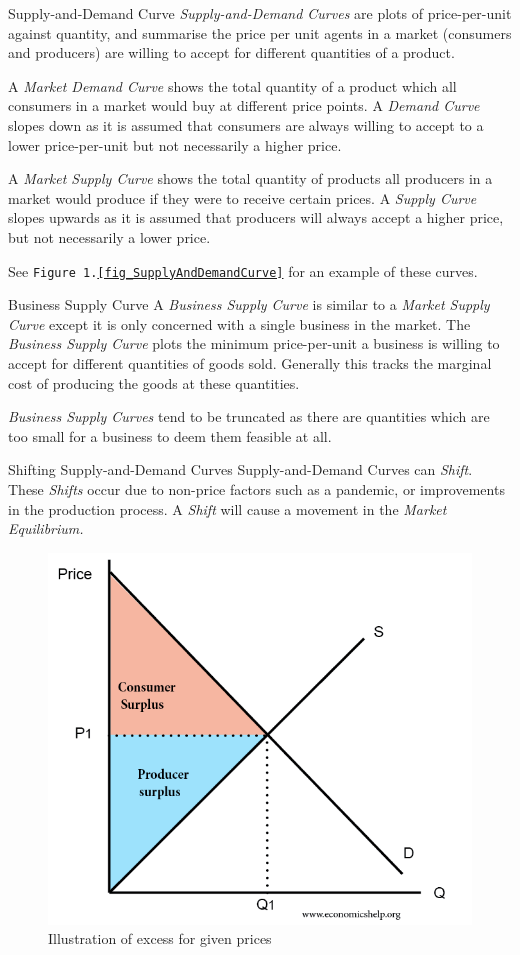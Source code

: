 \documentclass[11pt,a4paper]{article}
\begin{document}
  \begin{definition}{Supply-and-Demand Curve}
    \textit{Supply-and-Demand Curves} are plots of price-per-unit against quantity, and summarise the price per unit agents in a market (consumers and producers) are willing to accept for different quantities of a product.
    \par A \textit{Market Demand Curve} shows the total quantity of a product which all consumers in a market would buy at different price points. A \textit{Demand Curve} slopes down as it is assumed that consumers are always willing to accept to a lower price-per-unit but not necessarily a higher price.
    \par A \textit{Market Supply Curve} shows the total quantity of products all producers in a market would produce if they were to receive certain prices. A \textit{Supply Curve} slopes upwards as it is assumed that producers will always accept a higher price, but not necessarily a lower price.
    \par See \texttt{Figure 1.\ref{fig_SupplyAndDemandCurve}} for an example of these curves.
  \end{definition}

  \begin{definition}{Business Supply Curve}
    A \textit{Business Supply Curve} is similar to a \textit{Market Supply Curve} except it is only concerned with a single business in the market. The \textit{Business Supply Curve} plots the minimum price-per-unit a business is willing to accept for different quantities of goods sold. Generally this tracks the marginal cost of producing the goods at these quantities.
    \par \textit{Business Supply Curves} tend to be truncated as there are quantities which are too small for a business to deem them feasible at all.
  \end{definition}

  \begin{remark}{Shifting Supply-and-Demand Curves}
    Supply-and-Demand Curves can \textit{Shift}. These \textit{Shifts} occur due to non-price factors such as a pandemic, or improvements in the production process. A \textit{Shift} will cause a movement in the \textit{Market Equilibrium.}
  \end{remark}

  \begin{figure}[ht!]
    \centering
    \includegraphics[width=.3\textwidth]{Surplus.PNG}
    \caption{Illustration of excess for given prices}
    \label{fig_SupplyAndDemandSurplus}
  \end{figure}
\end{document}
